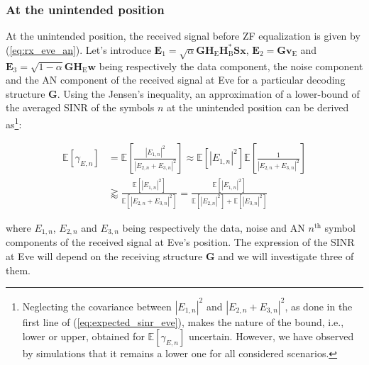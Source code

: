 \documentclass[journal,comsoc]{IEEEtran}
\newcommand{\EX}[1]{\mathbb{E} \left[#1\right]}%
\newcommand{\HE}{\textbf{H}_{\text{E}}}
\newcommand{\HB}{\textbf{H}_{\text{B}}}
\newcommand{\spread}{\textbf{S}}
\newcommand{\w}{\textbf{w}}
\begin{document}
\subsubsection{At the unintended position}
At the unintended position, the received signal before ZF equalization is given by (\ref{eq:rx_eve_an}). Let's introduce $\textbf{E}_1 = \sqrt{\alpha}  \textbf{G} \HE \HB^* \spread\textbf{x} $, $\textbf{E}_2 = \textbf{G}  \textbf{v}_\text{E}$ and $\textbf{E}_3 = \sqrt{1-\alpha} \textbf{G} \HE \w$ being respectively the data component, the noise component and the AN component of the received signal at Eve  for a particular decoding structure $\textbf{G}$. Using the Jensen's inequality, an approximation of a lower-bound of the averaged SINR of the symbols $n$ at the unintended position can be derived as\footnote{Neglecting the covariance between $\left|E_{1,n}\right|^2$ and $\left| E_{2,n} + E_{3,n}\right|^2$, as  done in the first line of (\ref{eq:expected_sinr_eve}), makes the nature of the bound, i.e., lower or upper, obtained for $\EX{\gamma_{E,n}}$ uncertain. However, we have observed by simulations that it remains a lower one for all considered scenarios.}:

\begin{equation}
\begin{split}
\EX{\gamma_{E,n}} &= \EX{  \frac{ \left| E_{1,n} \right|^2  }{ \left| E_{2,n} + E_{3,n} \right|^2 } }  \approx  \EX{ \left| E_{1,n} \right|^2 }  \EX{ \frac{1}{ \left| E_{2,n} + E_{3,n} \right|^2} }  \\
& \gtrapprox \frac{\EX{   \left| E_{1,n} \right|^2  } }{\EX{ \left| E_{2,n} + E_{3,n} \right|^2  }} =  \frac{\EX{  \left| E_{1,n}\right|^2  } }{\EX{  \left| E_{2,n} \right|^2  } +  \EX{  \left|E_{3,n}\right|^2  }}
\label{eq:expected_sinr_eve}
\end{split}
\end{equation}

where $E_{1,n}$, $E_{2,n}$ and $E_{3,n}$ being respectively the data, noise and AN $n^{\text{th}}$ symbol components of the received signal at Eve's position. The expression of the SINR at Eve will depend on the receiving structure $\textbf{G}$ and we will investigate three of them.
\end{document}
